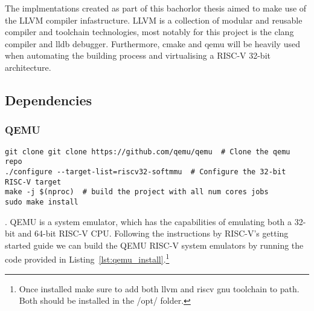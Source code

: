 The implmentations created as part of this bachorlor thesis aimed
to make use of the LLVM compiler infastructure.
LLVM is a collection of modular and reusable compiler and toolchain technologies,
most notably for this project is the clang compiler and
lldb debugger. Furthermore, cmake and qemu will be heavily used when automating
the building process and virtualising a RISC-V 32-bit architecture.

\subsection{Dependencies}
\subsubsection{QEMU}
\begin{lstlisting}[caption=Installing QEMU, float=*, label=lst:qemu_install]
git clone git clone https://github.com/qemu/qemu  # Clone the qemu repo
./configure --target-list=riscv32-softmmu  # Configure the 32-bit RISC-V target
make -j $(nproc)  # build the project with all num cores jobs
sudo make install
\end{lstlisting}.
QEMU is a system emulator, which has the capabilities of emulating both a 32-bit
and 64-bit RISC-V CPU.\cite{QEMU}
Following the instructions by RISC-V's getting started guide
we can build the QEMU RISC-V system emulators by running the code
provided in Listing~\ref{lst:qemu_install}.\footnote{Once
installed make sure to add both llvm and riscv gnu toolchain
to path. Both should be installed in the /opt/ folder.}\cite{RISC-V_GS}

